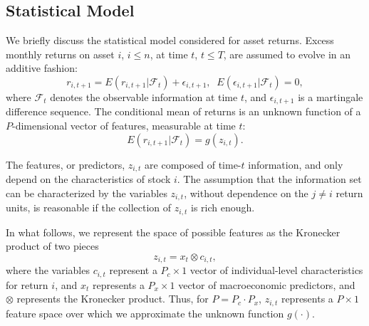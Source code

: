 \documentclass{article}
\begin{document}
\subsection{Statistical Model}
We briefly discuss the statistical model considered for asset returns. Excess monthly returns on asset $i$, $i\le n$, at time $t$, $t\le T$, are assumed to evolve in an additive fashion:
\begin{equation}\label{eq:model}
r_{i, t+1} = E(r_{i, t+1} | \mathcal{F}_t) + \epsilon_{i, t+1},\;\;E(\epsilon_{i, t+1}|\mathcal{F}_{t})=0,
\end{equation} where $\mathcal{F}_t$ denotes the observable information at time $t$, and $\epsilon_{i,t+1}$ is a martingale difference sequence. The conditional mean of returns is an unknown function of a $P$-dimensional vector of features, measurable at time $t$: 
\begin{equation}
E(r_{i, t+1} | \mathcal{F}_t) = g(z_{i,t}).
\end{equation} 

The features, or predictors, $z_{i,t}$ are composed of time-$t$ information, and only depend on the characteristics of stock $i$. The assumption that the information set can be characterized by the variables $z_{i,t}$, without dependence on the $j\neq i$ return units, is reasonable if the collection of $z_{i,t}$ is rich enough. 

In what follows, we represent  the space of possible features as the Kronecker product of two pieces
\begin{equation}
\label{kronecker_equation}
z_{i,t} = x_t \otimes c_{i,t},
\end{equation}where the variables \( c_{i,t} \) represent a \( P_c \times 1 \) vector of individual-level characteristics for return \(i\), and \(x_t\) represents a $P_x \times 1$ vector of macroeconomic predictors, and $\otimes$ represents the Kronecker product. Thus, for $P = P_c\cdot P_x$, $z_{i,t}$ represents a $P \times 1$ feature space over which we approximate the unknown function $g(\cdot)$.
\end{document}
